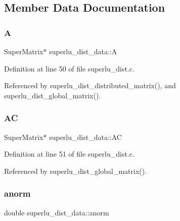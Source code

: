 \subsection{Member Data Documentation}
\mbox{\label{structsuperlu__dist__data_a8e78baf55994a10e8c84c6f1e8270c80}} 
\subsubsection{\texorpdfstring{A}{A}}
{\footnotesize\ttfamily Super\+Matrix$\ast$ superlu\+\_\+dist\+\_\+data\+::A}



Definition at line 50 of file superlu\+\_\+dist.\+c.



Referenced by superlu\+\_\+dist\+\_\+distributed\+\_\+matrix(), and superlu\+\_\+dist\+\_\+global\+\_\+matrix().

\mbox{\label{structsuperlu__dist__data_a2ed2468ce6d4541a39e1a99532d362a6}} 
\subsubsection{\texorpdfstring{AC}{AC}}
{\footnotesize\ttfamily Super\+Matrix$\ast$ superlu\+\_\+dist\+\_\+data\+::\+AC}



Definition at line 51 of file superlu\+\_\+dist.\+c.



Referenced by superlu\+\_\+dist\+\_\+global\+\_\+matrix().

\mbox{\label{structsuperlu__dist__data_acc2a4e57ead3ba7686c1adcdc882372b}} 
\subsubsection{\texorpdfstring{anorm}{anorm}}
{\footnotesize\ttfamily double superlu\+\_\+dist\+\_\+data\+::anorm}



